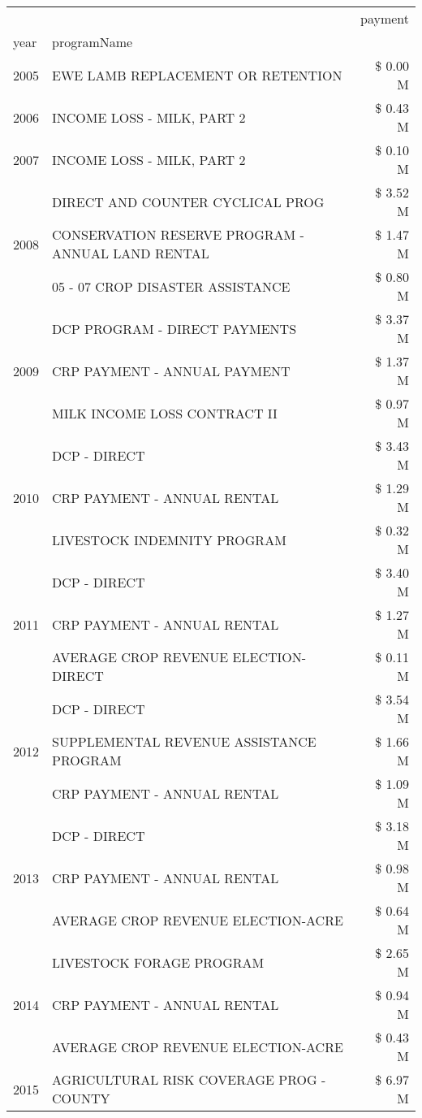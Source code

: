 \begin{tabular}{llr}
\toprule
 &  & payment \\
year & programName &  \\
\midrule
2005 & EWE LAMB REPLACEMENT OR RETENTION & \$ 0.00 M \\
\cline{1-3}
2006 & INCOME LOSS - MILK, PART 2 & \$ 0.43 M \\
\cline{1-3}
2007 & INCOME LOSS - MILK, PART 2 & \$ 0.10 M \\
\cline{1-3}
\multirow[t]{3}{*}{2008} & DIRECT AND COUNTER CYCLICAL PROG & \$ 3.52 M \\
 & CONSERVATION RESERVE PROGRAM - ANNUAL LAND RENTAL & \$ 1.47 M \\
 & 05 - 07 CROP DISASTER ASSISTANCE & \$ 0.80 M \\
\cline{1-3}
\multirow[t]{3}{*}{2009} & DCP PROGRAM - DIRECT PAYMENTS & \$ 3.37 M \\
 & CRP PAYMENT - ANNUAL PAYMENT & \$ 1.37 M \\
 & MILK INCOME LOSS CONTRACT II & \$ 0.97 M \\
\cline{1-3}
\multirow[t]{3}{*}{2010} & DCP - DIRECT & \$ 3.43 M \\
 & CRP PAYMENT - ANNUAL RENTAL & \$ 1.29 M \\
 & LIVESTOCK INDEMNITY PROGRAM & \$ 0.32 M \\
\cline{1-3}
\multirow[t]{3}{*}{2011} & DCP - DIRECT & \$ 3.40 M \\
 & CRP PAYMENT - ANNUAL RENTAL & \$ 1.27 M \\
 & AVERAGE CROP REVENUE ELECTION-DIRECT & \$ 0.11 M \\
\cline{1-3}
\multirow[t]{3}{*}{2012} & DCP - DIRECT & \$ 3.54 M \\
 & SUPPLEMENTAL REVENUE ASSISTANCE PROGRAM & \$ 1.66 M \\
 & CRP PAYMENT - ANNUAL RENTAL & \$ 1.09 M \\
\cline{1-3}
\multirow[t]{3}{*}{2013} & DCP - DIRECT & \$ 3.18 M \\
 & CRP PAYMENT - ANNUAL RENTAL & \$ 0.98 M \\
 & AVERAGE CROP REVENUE ELECTION-ACRE & \$ 0.64 M \\
\cline{1-3}
\multirow[t]{3}{*}{2014} & LIVESTOCK FORAGE PROGRAM & \$ 2.65 M \\
 & CRP PAYMENT - ANNUAL RENTAL & \$ 0.94 M \\
 & AVERAGE CROP REVENUE ELECTION-ACRE & \$ 0.43 M \\
\cline{1-3}
\multirow[t]{3}{*}{2015} & AGRICULTURAL RISK COVERAGE PROG - COUNTY & \$ 6.97 M \\

\end{tabular}
